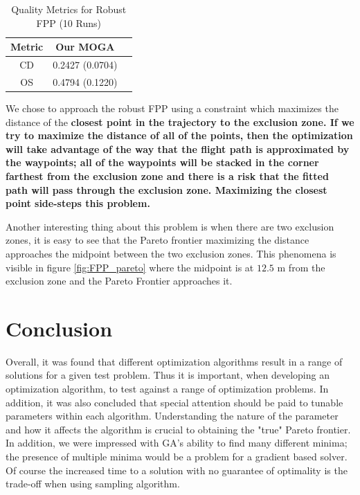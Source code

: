 \documentclass{article}
\begin{document}
\begin{table}[H]
\caption{Quality Metrics for Robust FPP (10 Runs)} 
\centering 
\begin{tabular}{|c|c|c|} 
\hline  
Metric &  Our MOGA \\ \hline
CD & 0.2427 (0.0704) \\ \hline
OS & 0.4794 (0.1220) \\ \hline
\end{tabular}
\label{tab:robustFPP} 
\end{table}

We chose to approach the robust FPP using a constraint which maximizes the distance of the \bf closest \rm point in the trajectory to the exclusion zone.  If we try to maximize the distance of all of the points, then the optimization will take advantage of the way that the flight path is approximated by the waypoints;  all of the waypoints will be stacked in the corner farthest from the exclusion zone and there is a risk that the fitted path will pass through the exclusion zone.  Maximizing the closest point side-steps this problem.  

Another interesting thing about this problem is when there are two exclusion zones, it is easy to see that the Pareto frontier maximizing  the distance approaches the midpoint between the two exclusion zones. This phenomena is visible in figure \ref{fig:FPP_pareto} where the midpoint is at $12.5$ m from the exclusion zone and the Pareto Frontier approaches it.  




%

\section{Conclusion}

Overall, it was found that different optimization algorithms result in a range of solutions for a given test problem. Thus it is important, when developing an optimization algorithm, to test against a range of optimization problems. In addition, it was also concluded that special attention should be paid to tunable parameters within each algorithm. Understanding the nature of the parameter and how it affects the algorithm is crucial to obtaining the "true" Pareto frontier. In addition, we were impressed with GA's ability to find many different minima; the presence of multiple minima would be a problem for a gradient based solver. Of course the increased time to a solution with no guarantee of optimality is the trade-off when using sampling algorithm.

 
\vspace{-0.1in}


 
 
\end{document}
